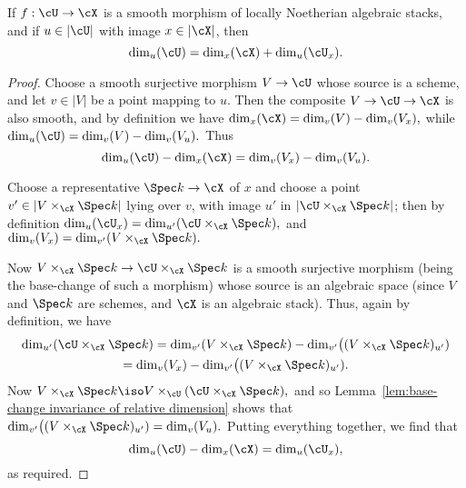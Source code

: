 \begin{alemma}
\label{lem:behaviour of dimensions w.r.t. smooth morphisms; stacky case}
If $f: \cU \to \cX$ is a smooth morphism of locally Noetherian algebraic
stacks, and
if $u \in |\cU|$ with image $x \in |\cX|$,
then $$\dim_u (\cU) = \dim_x(\cX) + \dim_{u} (\cU_x).$$
\end{alemma}
\begin{proof}
Choose a smooth surjective morphism $V \to \cU$ whose source
is a scheme, and let $v\in |V|$ be a point mapping to $u$.
Then the composite $V \to \cU \to \cX$ is also smooth,
and by definition we have $\dim_x(\cX) = \dim_v(V) - \dim_v(V_x),$
while $\dim_u(\cU) = \dim_v(V) - \dim_v(V_u).$
Thus
$$\dim_u(\cU) - \dim_x(\cX) = \dim_v (V_x) - \dim_v (V_u).$$

Choose a representative $\Spec k \to \cX$ of $x$
and choose a point $v' \in | V \times_{\cX} \Spec k|$ lying over
$v$, with image $u'$ in $|\cU\times_{\cX} \Spec k|$;
then by definition
$\dim_u(\cU_x) = \dim_{u'}(\cU\times_{\cX} \Spec k),$
and
$\dim_v(V_x) = \dim_{v'}(V\times_{\cX} \Spec k).$


Now $V\times_{\cX} \Spec k \to \cU\times_{\cX}\Spec k$
is a smooth surjective morphism (being the base-change 
of such a morphism) whose source is an algebraic space
(since $V$ and $\Spec k$ are schemes, and $\cX$
is an algebraic stack).  Thus, again by definition,
we have
\begin{multline*}
\dim_{u'}(\cU\times_{\cX} \Spec k) =
\dim_{v'}(V\times_{\cX} \Spec k) -
\dim_{v'}\bigl( (V\times_{\cX} \Spec k)_{u'})
\\
= \dim_v(V_x) - 
\dim_{v'}\bigl( (V\times_{\cX} \Spec k)_{u'}).
\end{multline*}
Now $V\times_{\cX} \Spec k \iso V\times_{\cU} (\cU\times_{\cX} \Spec k),$
and so
Lemma~\ref{lem:base-change invariance of relative dimension}
shows that
$\dim_{v'}\bigl( (V\times_{\cX} \Spec k)_{u'})  = \dim_v(V_u).$
Putting everything together, we find that
$$
\dim_u(\cU) - \dim_x(\cX) = 
\dim_u(\cU_x),$$
as required.
\end{proof}

